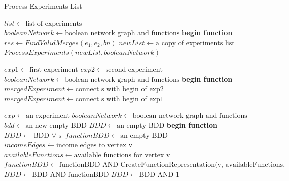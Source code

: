 \documentclass{article}      %
\newcounter{ct}
\begin{document}
\pagebreak

\begin{algorithm} \caption{Process Experiments List}
\begin{algorithmic}[1]
\State $list \gets \text{list of experiments}$
\State $booleanNetwork \gets \text{boolean network graph and functions}$
\State \textbf{begin function}
        \State $res \gets FindValidMerges(e_1, e_2, bn)$
                \State $newList \gets \text{a copy of experiments list}$
        \State {}
        \State {} $ProcessExperiments(newList, booleanNetwork)$
        \EndIf
        
        
    \EndFor
        \EndIf
\EndFunction

\end{algorithmic}
\end{algorithm}
\begin{algorithm}
\begin{algorithmic}[1]
\State $exp1 \gets \text{first experiment}$
\State $exp2 \gets \text{second experiment}$
\State $booleanNetwork \gets \text{boolean network graph and functions}$
\State \textbf{begin function}
        \State $mergedExperiment \gets \text{connect s with begin of exp2}$
                \State {}
        \EndIf
    \EndFor
        \State $mergedExperiment \gets \text{connect s with begin of exp1}$
                \State {}
        \EndIf
    \EndFor
\EndFunction
\end{algorithmic}
\end{algorithm}
\begin{algorithm}
\begin{algorithmic}[1]
\State $exp \gets \text{an experiment}$
\State $booleanNetwork \gets \text{boolean network graph and functions}$
\State $bdd \gets \text{an new empty BDD}$
\State {}
\State $BDD \gets \text{an empty BDD}$
\State \textbf{begin function}
        \State $BDD \gets \text {BDD $\vee$ s}$
    \EndFor
\State $functionBDD \gets \text{an empty BDD}$
        \State $incomeEdges \gets \text{income edges to vertex v}$
        \State $availableFunctions \gets \text{available functions for vertex v}$
        \State $functionBDD \gets \text{functionBDD AND CreateFunctionRepresentation(v, availableFunctions, incomeEdges, experiment.length)}$
    \EndFor
\State $BDD \gets \text{BDD AND functionBDD}$
\State $BDD \gets \text{BDD AND 1}$
    \State {}
\EndIf
    \State {}
\EndFunction
\end{algorithmic}
\end{algorithm}
\end{document}
